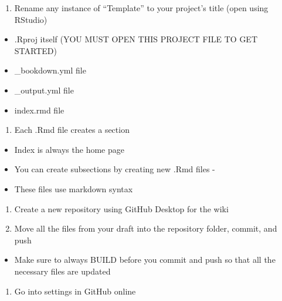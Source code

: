 \documentclass[]{book}
\providecommand{\tightlist}{%
  \setlength{\itemsep}{0pt}\setlength{\parskip}{0pt}}
\begin{document}
\begin{enumerate}
\def\labelenumi{\arabic{enumi}.}
\setcounter{enumi}{1}
\tightlist
\item
  Rename any instance of ``Template'' to your project's title (open
  using RStudio)
\end{enumerate}

\begin{itemize}
\tightlist
\item
  .Rproj itself (YOU MUST OPEN THIS PROJECT FILE TO GET STARTED)
\item
  \_bookdown.yml file
\item
  \_output.yml file
\item
  index.rmd file
\end{itemize}

\begin{enumerate}
\def\labelenumi{\arabic{enumi}.}
\setcounter{enumi}{2}
\tightlist
\item
  Each .Rmd file creates a section
\end{enumerate}

\begin{itemize}
\tightlist
\item
  Index is always the home page
\item
  You can create subsections by creating new .Rmd files -
\item
  These files use markdown syntax
\end{itemize}

\begin{enumerate}
\def\labelenumi{\arabic{enumi}.}
\setcounter{enumi}{3}
\item
  Create a new repository using GitHub Desktop for the wiki
\item
  Move all the files from your draft into the repository folder, commit,
  and push
\end{enumerate}

\begin{itemize}
\tightlist
\item
  Make sure to always BUILD before you commit and push so that all the
  necessary files are updated
\end{itemize}

\begin{enumerate}
\def\labelenumi{\arabic{enumi}.}
\setcounter{enumi}{5}
\tightlist
\item
  Go into settings in GitHub online
\end{enumerate}
\end{document}
